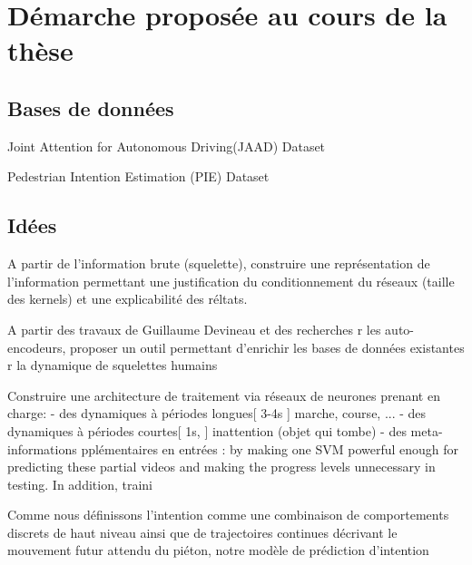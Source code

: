 \clearpage
\chapter{Démarche proposée au cours de la thèse}
\label{sec:SOTA}

\section{Bases de données}
Joint Attention for Autonomous Driving(JAAD) Dataset \cite{2016arXiv160904741K,Rasouli_2017_ICCV}

Pedestrian Intention Estimation (PIE) Dataset \cite{Rasouli2019PIE}

\section{Idées}

A partir de l'information brute (squelette), construire une représentation de l'information permettant une justification du conditionnement du réseaux (taille des kernels) et une explicabilité des réltats.

A partir des travaux de Guillaume Devineau et des recherches r les auto-encodeurs, proposer un outil permettant d'enrichir les bases de données existantes r la dynamique de squelettes humains


Construire une architecture de traitement via réseaux de neurones prenant en charge:
- des dynamiques à périodes longues[ 3-4s ] marche, course, ...
- des dynamiques à périodes courtes[ 1s, ] inattention (objet qui tombe)
- des meta-informations pplémentaires en entrées : by making one
SVM powerful enough for predicting these partial videos
and making the progress levels unnecessary in testing. In
addition, traini

Comme nous définissons l'intention comme une combinaison de comportements discrets de haut niveau ainsi que de trajectoires continues décrivant le mouvement futur attendu du piéton, notre modèle de prédiction d'intention